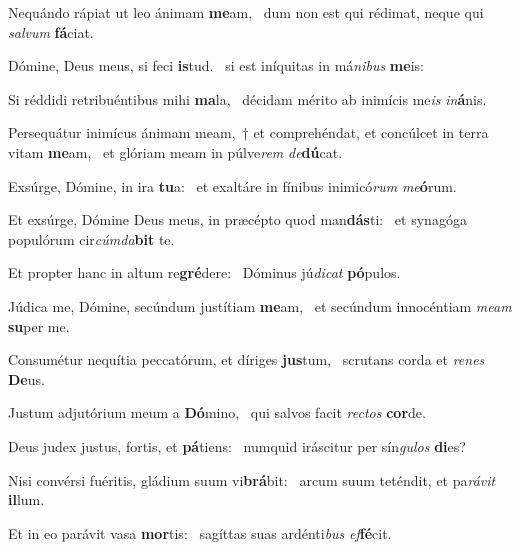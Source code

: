 \item Nequándo rápiat ut leo ánimam \textbf{me}am,~\psstar{} dum non est qui rédimat, neque qui \textit{sal}\textit{vum} \textbf{fá}ciat.

\item Dómine, Deus meus, si feci \textbf{is}tud.~\psstar{} si est iníquitas in má\textit{ni}\textit{bus} \textbf{me}is:

\item Si réddidi retribuéntibus mihi \textbf{ma}la,~\psstar{} décidam mérito ab inimícis me\textit{is} \textit{in}\textbf{á}nis.

\item Persequátur inimícus ánimam meam,~† et comprehéndat, et concúlcet in terra vitam \textbf{me}am,~\psstar{} et glóriam meam in púlve\textit{rem} \textit{de}\textbf{dú}cat.

\item Exsúrge, Dómine, in ira \textbf{tu}a:~\psstar{} et exaltáre in fínibus inimicó\textit{rum} \textit{me}\textbf{ó}rum.

\item Et exsúrge, Dómine Deus meus, in præcépto quod man\textbf{dás}ti:~\psstar{} et synagóga populórum cir\textit{cúm}\textit{da}\textbf{bit} te.

\item Et propter hanc in altum re\textbf{gré}dere:~\psstar{} Dóminus jú\textit{di}\textit{cat} \textbf{pó}pulos.

\item Júdica me, Dómine, secúndum justítiam \textbf{me}am,~\psstar{} et secúndum innocéntiam \textit{me}\textit{am} \textbf{su}per me.

\item Consumétur nequítia peccatórum, et díriges \textbf{jus}tum,~\psstar{} scrutans corda et \textit{re}\textit{nes} \textbf{De}us.

\item Justum adjutórium meum a \textbf{Dó}mino,~\psstar{} qui salvos facit \textit{rec}\textit{tos} \textbf{cor}de.

\item Deus judex justus, fortis, et \textbf{pá}tiens:~\psstar{} numquid iráscitur per sín\textit{gu}\textit{los} \textbf{di}es?

\item Nisi convérsi fuéritis, gládium suum vi\textbf{brá}bit:~\psstar{} arcum suum teténdit, et pa\textit{rá}\textit{vit} \textbf{il}lum.

\item Et in eo parávit vasa \textbf{mor}tis:~\psstar{} sagíttas suas ardénti\textit{bus} \textit{ef}\textbf{fé}cit.

